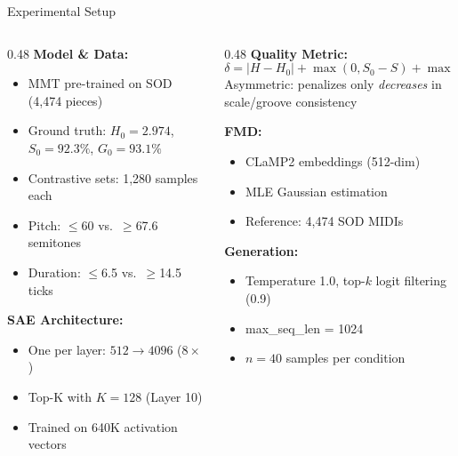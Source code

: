 \documentclass[aspectratio=169, 11pt]{beamer}
\begin{document}
\begin{frame}{Experimental Setup}

\begin{columns}[T]
\begin{column}{0.48\textwidth}
\textbf{Model \& Data:}
\begin{itemize}
  \item MMT pre-trained on SOD (4,474 pieces)
  \item Ground truth: $H_0{=}2.974$, $S_0{=}92.3\%$, $G_0{=}93.1\%$
  \item Contrastive sets: 1,280 samples each
  \item Pitch: $\leq$60 vs.\ $\geq$67.6 semitones
  \item Duration: $\leq$6.5 vs.\ $\geq$14.5 ticks
\end{itemize}

\vspace{0.5em}
\textbf{SAE Architecture:}
\begin{itemize}
  \item One per layer: $512 \to 4096$ ($8\times$)
  \item Top-K with $K{=}128$ (Layer 10)
  \item Trained on 640K activation vectors
\end{itemize}
\end{column}

\begin{column}{0.48\textwidth}
\textbf{Quality Metric:}
$$\delta = |H - H_0| + \max(0, S_0 - S) + \max(0, G_0 - G)$$
{\small Asymmetric: penalizes only \emph{decreases} in scale/groove consistency}

\vspace{0.5em}
\textbf{FMD:}
\begin{itemize}
  \item CLaMP2 embeddings (512-dim)
  \item MLE Gaussian estimation
  \item Reference: 4,474 SOD MIDIs
\end{itemize}

\vspace{0.5em}
\textbf{Generation:}
\begin{itemize}
  \item Temperature 1.0, top-$k$ logit filtering (0.9)
  \item max\_seq\_len = 1024
  \item $n{=}40$ samples per condition
\end{itemize}
\end{column}
\end{columns}

\end{frame}
\end{document}
